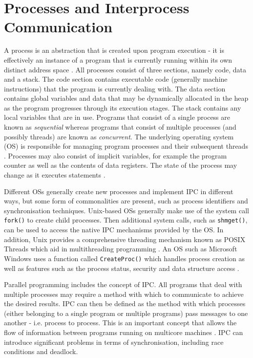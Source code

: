 \documentclass[12pt] {newrucsthesis}    %
\def\code#1{\texttt{#1}}
\begin{document}
    \section{Processes and Interprocess Communication}
      A process is an abstraction that is created upon program execution - it is effectively an instance
      of a program that is currently running within its own distinct address space \citep{modernOS}.
      All processes consist of three sections, namely code, data and a stack. The code section contains
      executable code (generally machine instructions) that the program is currently dealing with.
      The data section contains global variables and data that may be dynamically allocated in the heap
      as the program progresses through its execution stages. The stack contains any local variables that are in use.
      Programs that consist of a single process are known as \textit{sequential} whereas programs that consist
      of multiple processes (and possibly threads) are known as \textit{concurrent}. The underlying operating
      system (OS) is responsible for managing program processes and their subsequent threads \citep{garg2005concurrent}.
      Processes may also consist of implicit variables, for example the program counter as well as the
      contents of data registers. The state of the process may change as it executes statements \citep{trainBook}.

      Different OSs generally create new processes and implement IPC in different ways, but some form of commonalities
      are present, such as process identifiers and synchronisation techniques. Unix-based OSs generally make use of the
      system call \code{fork()} to create child processes. Then additional system calls, such as \code{shmget()}, can be
      used to access the native IPC mechanisms provided by the OS. In addition, Unix provides a comprehensive threading
      mechanism known as POSIX Threads which aid in multithreading programming \citep{linuxKernal}. An OS such as Microsoft
      Windows uses a function called \code{CreateProc()} which handles process creation as well as features such as the
      process status, security and data structure access \citep{modernOS}.

      Parallel programming includes the concept of IPC. All programs that deal with multiple processes may require a
      method with which to communicate to achieve the desired results. IPC can then be defined as the method with
      which processes (either belonging to a single program or multiple programs) pass messages to one another - i.e.
      process to process. This is an important concept that allows the flow of information between programs running on
      multicore machines \citep{modernOS}. IPC can introduce significant problems in terms of synchronisation,
      including race conditions and deadlock.
\end{document}
